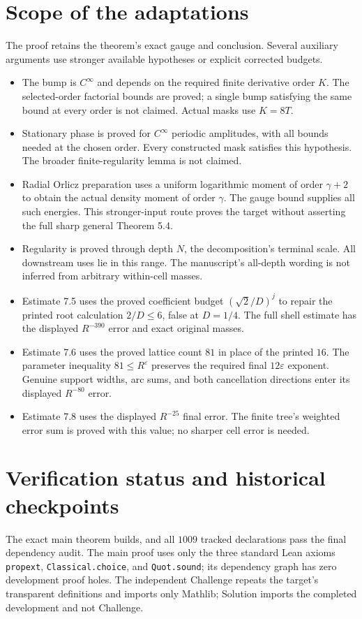 \documentclass[11pt]{article}
\begin{document}
\section*{Scope of the adaptations}
The proof retains the theorem's exact gauge and conclusion. Several auxiliary
arguments use stronger available hypotheses or explicit corrected budgets.
\begin{itemize}
\item The bump is $C^\infty$ and depends on the required finite derivative order
$K$. The selected-order factorial bounds are proved; a single bump satisfying
the same bound at every order is not claimed. Actual masks use $K=8T$.
\item Stationary phase is proved for $C^\infty$ periodic amplitudes, with all
bounds needed at the chosen order. Every constructed mask satisfies this
hypothesis. The broader finite-regularity lemma is not claimed.
\item Radial Orlicz preparation uses a uniform logarithmic moment of order
$\gamma+2$ to obtain the actual density moment of order $\gamma$. The gauge
bound supplies all such energies. This stronger-input route proves the target
without asserting the full sharp general Theorem 5.4.
\item Regularity is proved through depth $N$, the decomposition's terminal
scale. All downstream uses lie in this range. The manuscript's all-depth
wording is not inferred from arbitrary within-cell masses.
\item Estimate 7.5 uses the proved coefficient budget $(\sqrt2/D)^j$ to repair
the printed root calculation $2/D\le6$, false at $D=1/4$. The full shell
estimate has the displayed $R^{-390}$ error and exact original masses.
\item Estimate 7.6 uses the proved lattice count $81$ in place of the printed
$16$. The parameter inequality $81\le R^\varepsilon$ preserves the required
final $12\varepsilon$ exponent. Genuine support widths, arc sums, and both
cancellation directions enter its displayed $R^{-80}$ error.
\item Estimate 7.8 uses the displayed $R^{-25}$ final error. The finite tree's
weighted error sum is proved with this value; no sharper cell error is needed.
\end{itemize}

\newpage
\section*{Verification status and historical checkpoints}
The exact main theorem builds, and all $1009$ tracked declarations pass the
final dependency audit. The main proof uses only the three standard Lean
axioms \texttt{propext}, \texttt{Classical.choice}, and \texttt{Quot.sound};
its dependency graph has zero development proof holes. The independent
Challenge repeats the target's transparent definitions and imports only
Mathlib; Solution imports the completed development and not Challenge.
\end{document}
